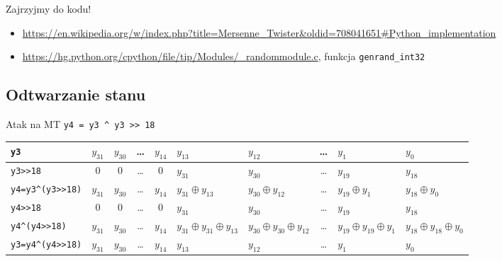 \documentclass{mp}
\newcommand{\xor}{\oplus}
\begin{document}
\begin{frame}{Zajrzyjmy do kodu!}
\begin{itemize}
\item \url{https://en.wikipedia.org/w/index.php?title=Mersenne\_Twister&oldid=708041651\#Python\_implementation}
\item \url{https://hg.python.org/cpython/file/tip/Modules/_randommodule.c}, funkcja \texttt{genrand\_int32}
\end{itemize}
\end{frame}

\subsection{Odtwarzanie stanu}

\begin{frame}{Atak na MT}
\texttt{y4 = y3 \^{} y3 >> 18} \\
\pause
\setlength\tabcolsep{3pt}
\small
\begin{tabular}{l||c|c|c|c|p{1.3cm}|p{1.3cm}|c|p{1.3cm}|p{1.3cm}|}
\hline
\texttt{y3} & $y_{31}$ & $y_{30}$ & \ldots & $y_{14}$ & $y_{13}$ & $y_{12}$ & \ldots & $y_1$ & $y_0$ \\
\hline
\pause
\texttt{y3>>18} & 0 & 0 & \ldots & 0 & $y_{31}$ & $y_{30}$ & \ldots & $y_{19}$ & $y_{18}$ 
\\
\hline
\pause
\texttt{y4=y3\^{}(y3>>18)} & $y_{31}$ & $y_{30}$ & \ldots & $y_{14}$ & $y_{31}\xor y_{13}$ & $y_{30}\xor y_{12}$ & \ldots & $y_{19}\xor y_1$ & $y_{18}\xor y_0$ \\
\hline
\hline
\pause
\texttt{y4>>18}  & 0 & 0 & \ldots & 0 & $y_{31}$ & $y_{30}$ & \ldots & $y_{19}$ & $y_{18}$  \\
\hline
\pause
\texttt{y4\^{}(y4>>18)} & $y_{31}$ & $y_{30}$ & \ldots & $y_{14}$ & $y_{31}\xor y_{31}\xor y_{13}$ & $y_{30}\xor y_{30}\xor y_{12}$ & \ldots & $y_{19}\xor y_{19}\xor y_1$ & $y_{18}\xor y_{18}\xor y_0$ \\
\hline
\pause
\texttt{y3=y4\^{}(y4>>18)} & $y_{31}$ & $y_{30}$ & \ldots & $y_{14}$ & $y_{13}$ & $y_{12}$ & \ldots & $y_1$ & $y_0$ \\
\hline
\end{tabular}
\end{frame}
\end{document}
